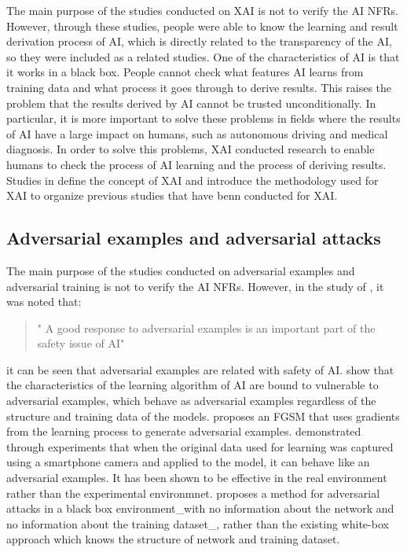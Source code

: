 \documentclass[journal,article,submit,moreauthors,pdftex]{Definitions/mdpi}
\begin{document}
The main purpose of the studies conducted on XAI is not to verify the AI NFRs.
However, through these studies, people were able to know the learning and result derivation process of AI, which is directly related to the transparency of the AI, so they were included as a related studies.
One of the characteristics of AI is that it works in a black box. People cannot check what features AI learns from training data and what process it goes through to derive results.
This raises the problem that the results derived by AI cannot be trusted unconditionally.
In particular, it is more important to solve these problems in fields where the results of AI have a large impact on humans, such as autonomous driving and medical diagnosis.
In order to solve this problems, XAI conducted research to enable humans to check the process of AI learning and the process of deriving results.
Studies in \cite{xai-samek, xai-arrieta} define the concept of XAI and introduce the methodology used for XAI to organize previous studies that have benn conducted for XAI.

\subsection{Adversarial examples and adversarial attacks}

The main purpose of the studies conducted on adversarial examples and adversarial training is not to verify the AI NFRs.
However, in the study of \cite{adversarial-kurakin}, it was noted that:
\begin{quote}
   " A good response to adversarial examples is an important part of the safety issue of AI"
\end{quote}
it can be seen that adversarial examples are related with safety of AI.
\cite{adversarial-szegedy,adversarial-goodfellow} show that the characteristics of the learning algorithm of AI are bound to vulnerable to adversarial examples, which behave as adversarial examples regardless of the structure and training data of the models.
\cite{adversarial-goodfellow} proposes an FGSM that uses gradients from the learning process to generate adversarial examples.
\cite{adversarial-kurakin2} demonstrated through experiments that when the original data used for learning was captured using a smartphone camera and applied to the model, it can behave like an adversarial examples. It has been shown to be effective in the real environment rather than the experimental environmnet.
\cite{adversarial-papernot} proposes a method for adversarial attacks in a black box environment\_with no information about the network and no information about the training dataset\_, rather than the existing white-box approach which knows the structure of network and training dataset.
\end{document}
